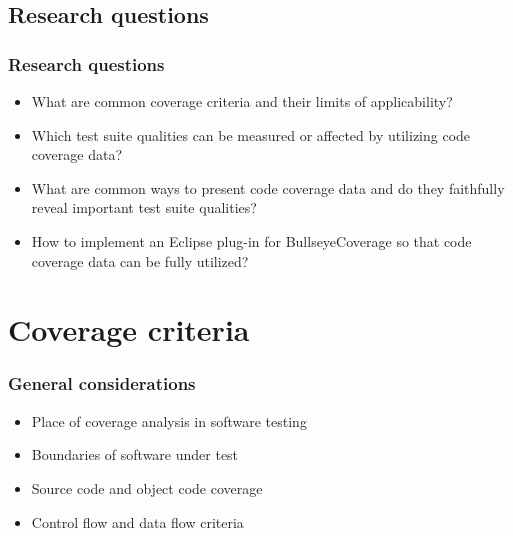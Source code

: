 \documentclass{beamer}
\begin{document}
\subsection{Research questions}

\begin{frame}
  \frametitle{Research questions}
\begin{itemize}[<+->]
  \item What are common coverage criteria and their limits of applicability?
  \item Which test suite qualities can be measured or affected by utilizing code coverage data?
  \item What are common ways to present code coverage data and do they faithfully reveal important test suite qualities?
  \item How to implement an Eclipse plug-in for BullseyeCoverage so that code coverage data can be fully utilized?
\end{itemize}
\end{frame}


\section{Coverage criteria}

\begin{frame}
  \frametitle{General considerations}
\begin{itemize}[<+->]
  \item Place of coverage analysis in software testing
  \item Boundaries of software under test
  \item Source code and object code coverage
  \item Control flow and data flow criteria
\end{itemize}
\end{frame}
\end{document}
